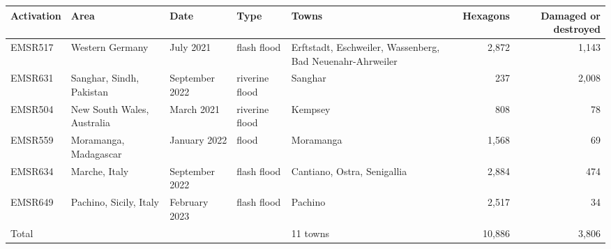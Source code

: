 \setlength{\tabcolsep}{4pt}
\begin{tabular}{@{}llllp{45mm}rr@{}}
\toprule
Activation & Area & Date & Type & Towns & Hexagons & Damaged or destroyed \\
\midrule
EMSR517 & Western Germany & July 2021 & flash flood & Erftstadt, Eschweiler, Wassenberg, Bad Neuenahr-Ahrweiler & 2{,}872 & 1{,}143 \\
EMSR631 & Sanghar, Sindh, Pakistan & September 2022 & riverine flood & Sanghar & 237 & 2{,}008 \\
EMSR504 & New South Wales, Australia & March 2021 & riverine flood & Kempsey & 808 & 78 \\
EMSR559 & Moramanga, Madagascar & January 2022 & flood & Moramanga & 1{,}568 & 69 \\
EMSR634 & Marche, Italy & September 2022 & flash flood & Cantiano, Ostra, Senigallia & 2{,}884 & 474 \\
EMSR649 & Pachino, Sicily, Italy & February 2023 & flash flood & Pachino & 2{,}517 & 34 \\
\midrule
Total & & & & 11 towns & 10{,}886 & 3{,}806 \\
\bottomrule
\end{tabular}
